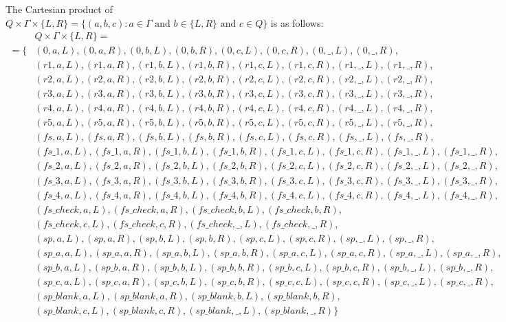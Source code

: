 \documentclass[12pt, a4paper]{report}
\begin{document}
{	The Cartesian product of $ Q \times \Gamma \times \{L,R\} = \{(a,b,c) : a \in \Gamma \text{~and~} b \in \{L,R\} \text{~and~} c \in Q \}$ is as follows:
		\begin{equation}\label{eq:Q_times_Gamma_times_LR}
		\begin{aligned}
		& Q \times \Gamma \times \{L,R\} = \\
		= \{
			& (0,a,L), (0,a,R), (0,b,L), (0,b,R), (0,c,L), (0,c,R), (0,\_,L), (0,\_,R), \\
			& (r1,a,L), (r1,a,R), (r1,b,L), (r1,b,R), (r1,c,L), (r1,c,R), (r1,\_,L), (r1,\_,R), \\
			& (r2,a,L), (r2,a,R), (r2,b,L), (r2,b,R), (r2,c,L), (r2,c,R), (r2,\_,L), (r2,\_,R), \\
			& (r3,a,L), (r3,a,R), (r3,b,L), (r3,b,R), (r3,c,L), (r3,c,R), (r3,\_,L), (r3,\_,R), \\
			& (r4,a,L), (r4,a,R), (r4,b,L), (r4,b,R), (r4,c,L), (r4,c,R), (r4,\_,L), (r4,\_,R), \\
			& (r5,a,L), (r5,a,R), (r5,b,L), (r5,b,R), (r5,c,L), (r5,c,R), (r5,\_,L), (r5,\_,R), \\
			& (fs,a,L), (fs,a,R), (fs,b,L), (fs,b,R), (fs,c,L), (fs,c,R), (fs,\_,L), (fs,\_,R), \\
			& (fs\_1,a,L), (fs\_1,a,R), (fs\_1,b,L), (fs\_1,b,R), (fs\_1,c,L), (fs\_1,c,R), (fs\_1,\_,L), (fs\_1,\_,R), \\
			& (fs\_2,a,L), (fs\_2,a,R), (fs\_2,b,L), (fs\_2,b,R), (fs\_2,c,L), (fs\_2,c,R), (fs\_2,\_,L), (fs\_2,\_,R), \\
			& (fs\_3,a,L), (fs\_3,a,R), (fs\_3,b,L), (fs\_3,b,R), (fs\_3,c,L), (fs\_3,c,R), (fs\_3,\_,L), (fs\_3,\_,R), \\
			& (fs\_4,a,L), (fs\_4,a,R), (fs\_4,b,L), (fs\_4,b,R), (fs\_4,c,L), (fs\_4,c,R), (fs\_4,\_,L), (fs\_4,\_,R), \\
			& (fs\_check,a,L), (fs\_check,a,R), (fs\_check,b,L), (fs\_check,b,R), \\
			& (fs\_check,c,L), (fs\_check,c,R), (fs\_check,\_,L), (fs\_check,\_,R), \\
			& (sp,a,L), (sp,a,R), (sp,b,L), (sp,b,R), (sp,c,L), (sp,c,R), (sp,\_,L), (sp,\_,R), \\
			& (sp\_a,a,L), (sp\_a,a,R), (sp\_a,b,L), (sp\_a,b,R), (sp\_a,c,L), (sp\_a,c,R), (sp\_a,\_,L), (sp\_a,\_,R), \\
			& (sp\_b,a,L), (sp\_b,a,R), (sp\_b,b,L), (sp\_b,b,R), (sp\_b,c,L), (sp\_b,c,R), (sp\_b,\_,L), (sp\_b,\_,R), \\
			& (sp\_c,a,L), (sp\_c,a,R), (sp\_c,b,L), (sp\_c,b,R), (sp\_c,c,L), (sp\_c,c,R), (sp\_c,\_,L), (sp\_c,\_,R), \\
			& (sp\_blank,a,L), (sp\_blank,a,R), (sp\_blank,b,L), (sp\_blank,b,R), \\
			& (sp\_blank,c,L), (sp\_blank,c,R), (sp\_blank,\_,L), (sp\_blank,\_,R) \}      \\
		\end{aligned}
		\end{equation}

}
\end{document}

